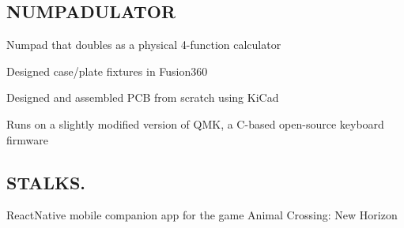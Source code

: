 \documentclass[letter,10pt]{article}
\begin{document}
\subsection{{NUMPADULATOR}}
\begin{zitemize}
\item Numpad that doubles as a physical 4-function calculator
\item Designed case/plate fixtures in Fusion360
\item Designed and assembled PCB from scratch using KiCad
\item Runs on a slightly modified version of QMK, a C-based open-source keyboard firmware
\end{zitemize}

\subsection{{STALKS.}}
\begin{zitemize}
\item ReactNative mobile companion app for the game Animal Crossing: New Horizon
\end{zitemize}
\end{document}

